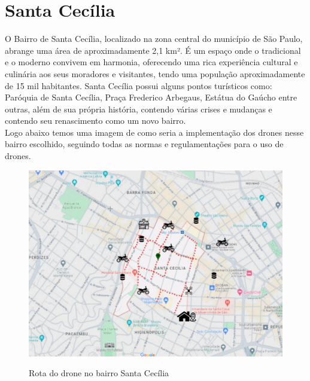  \section{Santa Cecília}

 O Bairro de Santa Cecília, localizado na zona central do município de São Paulo, abrange uma área de aproximadamente 2,1 km². É um espaço onde o tradicional e o moderno convivem em harmonia, oferecendo uma rica experiência cultural e culinária aos seus moradores e visitantes, tendo uma população aproximadamente
de 15 mil habitantes. Santa Cecília possui alguns pontos turísticos como: Paróquia de Santa Cecília, Praça Frederico Arbegaus, Estátua do Gaúcho entre outras, além de sua própria história, contendo várias crises e mudanças e contendo seu renascimento
como um novo bairro.\\
Logo abaixo temos uma imagem de como seria a implementação dos drones nesse bairro escolhido, seguindo todas as normas e regulamentações para o uso de drones.

\begin{figure} [!ht]
    {\centering
    \caption{Rota do drone no bairro Santa Cecília}
    \includegraphics[width=0.9\linewidth]{figuras/rota santa cecilia.png}
    \label{fig:enter-label}
    }
\end{figure}

